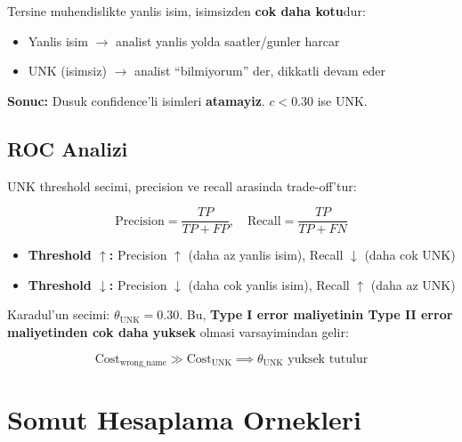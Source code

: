 \begin{uyari}
Tersine muhendislikte yanlis isim, isimsizden \textbf{cok daha kotu}dur:
\begin{itemize}
\item Yanlis isim $\to$ analist yanlis yolda saatler/gunler harcar
\item UNK (isimsiz) $\to$ analist ``bilmiyorum'' der, dikkatli devam eder
\end{itemize}

\textbf{Sonuc:} Dusuk confidence'li isimleri \textbf{atamayiz}. $c < 0.30$ ise UNK.
\end{uyari}

\subsection{ROC Analizi}

UNK threshold secimi, precision ve recall arasinda trade-off'tur:

\begin{equation}
\text{Precision} = \frac{TP}{TP + FP}, \quad \text{Recall} = \frac{TP}{TP + FN}
\end{equation}

\begin{itemize}
\item \textbf{Threshold $\uparrow$:} Precision $\uparrow$ (daha az yanlis isim), Recall $\downarrow$ (daha cok UNK)
\item \textbf{Threshold $\downarrow$:} Precision $\downarrow$ (daha cok yanlis isim), Recall $\uparrow$ (daha az UNK)
\end{itemize}

Karadul'un secimi: $\theta_{\text{UNK}} = 0.30$. Bu, \textbf{Type I error maliyetinin Type II error maliyetinden cok daha yuksek} olmasi varsayimindan gelir:

\begin{equation}
\text{Cost}_{\text{wrong\_name}} \gg \text{Cost}_{\text{UNK}} \implies \theta_{\text{UNK}} \text{ yuksek tutulur}
\end{equation}


\section{Somut Hesaplama Ornekleri}
\label{sec:bayesian-examples}

